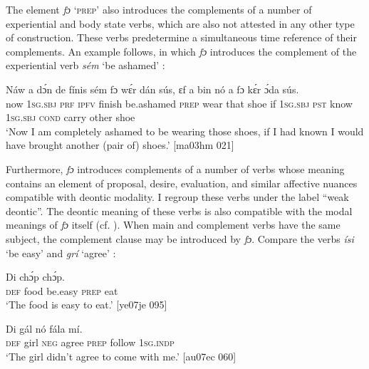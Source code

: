 The element\textit{ fɔ} ‘\textsc{prep}’ also introduces the complements of a number of experiential and body state verbs, which are also not attested in any other type of construction. These verbs predetermine a simultaneous time reference of their complements. An example follows, in which \textit{fɔ} introduces the complement of the experiential verb \textit{sém} ‘be ashamed’ :


\ea%
    \label{ex:key:1387}
    \gll Náw    a    dɔ́n    de  fínis    sém      fɔ  wɛ́r    dán    sús,
ɛf  a    bin  nó    a    fɔ  kɛ́r    ɔ́da    sús.\\
now    \textsc{1sg.sbj}  \textsc{prf}    \textsc{ipfv}  finish  be.ashamed  \textsc{prep}  wear  that    shoe
if  \textsc{1sg.sbj}  \textsc{pst}  know  \textsc{1sg.sbj}  \textsc{cond}  carry  other  shoe\\

\glt ‘Now I am completely ashamed to be wearing those shoes, if I had known
I would have brought another (pair of) shoes.’ [ma03hm 021]
\z

Furthermore, \textit{fɔ} introduces complements of a number of verbs whose meaning contains an element of proposal, desire, evaluation, and similar affective nuances compatible with deontic modality. I regroup these verbs under the label “weak deontic”. The deontic meaning of these verbs is also compatible with the modal meanings of \textit{fɔ} itself (cf. ). When main and complement verbs have the same subject, the complement clause may be introduced by \textit{fɔ}. Compare the verbs \textit{ísi} ‘be easy’  and \textit{grí} ‘agree’ : 


\ea%
    \label{ex:key:1388}
    \gll Di  chɔ́p       chɔ́p.\\
\textsc{def}  food    be.easy  \textsc{prep}  eat\\

\glt ‘The food is easy to eat.’ [ye07je 095]
\z


\ea%
    \label{ex:key:1389}
    \gll Di  gál    nó       fála    mí.\\
\textsc{def}  girl    \textsc{neg}  agree  \textsc{prep}  follow  \textsc{1sg.indp}\\

\glt ‘The girl didn’t agree to come with me.’ [au07ec 060]
\z

